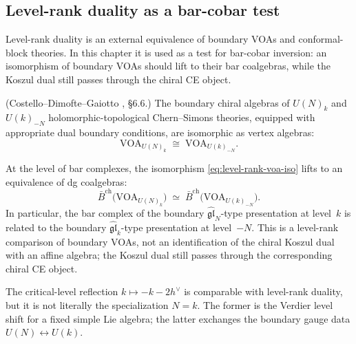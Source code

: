 \subsection{Level-rank duality as a bar-cobar test}
\label{sec:level-rank-bar-cobar}

Level-rank duality is an external equivalence of boundary VOAs and
conformal-block theories.  In this chapter it is used as a test for
bar-cobar inversion: an isomorphism of boundary VOAs should lift to
their bar coalgebras, while the Koszul dual still passes through the
chiral CE object.

\begin{proposition}
\label{prop:level-rank-boundary-voa}
\textup{(Costello--Dimofte--Gaiotto \cite{CDG2023}, \S6.6.)}
The boundary chiral algebras of $U(N)_k$ and $U(k)_{-N}$
holomorphic-topological Chern--Simons theories, equipped with
appropriate dual boundary conditions, are isomorphic as vertex
algebras:
\begin{equation}\label{eq:level-rank-voa-iso}
 \mathrm{VOA}_{U(N)_k}
 \;\cong\;
 \mathrm{VOA}_{U(k)_{-N}}.
\end{equation}
\end{proposition}

\begin{corollary}
\label{cor:level-rank-bar-intertwining}
At the level of bar complexes, the isomorphism
\eqref{eq:level-rank-voa-iso} lifts to an equivalence of dg
coalgebras:
\begin{equation}\label{eq:level-rank-bar-equiv}
 \bar{B}^{\mathrm{ch}}\bigl(\mathrm{VOA}_{U(N)_k}\bigr)
 \;\simeq\;
 \bar{B}^{\mathrm{ch}}\bigl(\mathrm{VOA}_{U(k)_{-N}}\bigr).
\end{equation}
In particular, the bar complex of the boundary
\(\widehat{\mathfrak{gl}}_N\)-type presentation at level~$k$ is related
to the boundary \(\widehat{\mathfrak{gl}}_k\)-type presentation at
level~$-N$. This is a level-rank comparison of boundary VOAs, not an
identification of the chiral Koszul dual with an affine algebra; the
Koszul dual still passes through the corresponding chiral CE object.
\end{corollary}

\begin{remark}
\label{rem:level-rank-feigin-frenkel}
The critical-level reflection $k \mapsto -k - 2h^\vee$ is comparable
with level-rank duality, but it is not literally the
specialization $N=k$. The former is the Verdier level shift for a fixed
simple Lie algebra; the latter exchanges the boundary gauge data
$U(N) \leftrightarrow U(k)$.
\end{remark}

